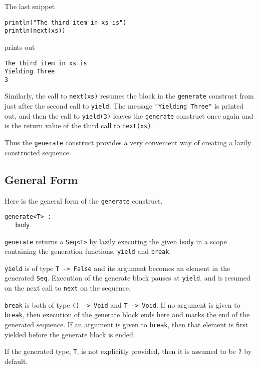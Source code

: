 \documentclass[10pt,oneside]{book}
\begin{document}
The last snippet
\begin{lstlisting}
println("The third item in xs is")
println(next(xs))
\end{lstlisting}
prints out
\begin{lstlisting}
The third item in xs is
Yielding Three
3
\end{lstlisting}
Similarly, the call to \texttt{\frenchspacing next(xs)} resumes the block in the \texttt{\frenchspacing generate} construct from just after the second call to \texttt{\frenchspacing yield}. The message \texttt{\frenchspacing "Yielding Three"} is printed out, and then the call to \texttt{\frenchspacing yield(3)} leaves the \texttt{\frenchspacing generate} construct once again and \texttt{} is the return value of the third call to \texttt{\frenchspacing next(xs)}.

Thus the \texttt{\frenchspacing generate} construct provides a very convenient way of creating a lazily constructed sequence. 

\subsection*{General Form}
Here is the general form of the \texttt{\frenchspacing generate} construct.
\begin{lstlisting}
generate<T> :
   body
\end{lstlisting}
\texttt{\frenchspacing generate} returns a \texttt{\frenchspacing Seq<T>} by lazily executing the given \texttt{\frenchspacing body} in a scope containing the generation functions, \texttt{\frenchspacing yield} and \texttt{\frenchspacing break}. 

\texttt{\frenchspacing yield} is of type \texttt{\frenchspacing T -> False} and its argument becomes an element in the generated \texttt{\frenchspacing Seq}. Execution of the generate block pauses at \texttt{\frenchspacing yield}, and is resumed on the next call to \texttt{\frenchspacing next} on the sequence.

\texttt{\frenchspacing break} is both of type \texttt{\frenchspacing () -> Void} and \texttt{\frenchspacing T -> Void}. If no argument is given to \texttt{\frenchspacing break}, then execution of the generate block ends here and marks the end of the generated sequence. If an argument is given to \texttt{\frenchspacing break}, then that element is first yielded before the generate block is ended.

If the generated type, \texttt{\frenchspacing T}, is not explicitly provided, then it is assumed to be \texttt{\frenchspacing ?} by default.
\end{document}
